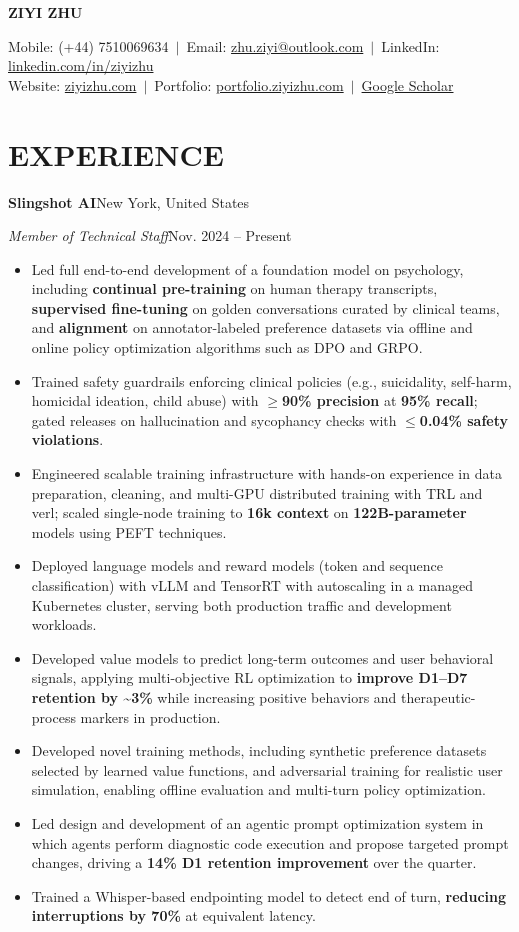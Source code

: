 \documentclass[10pt,a4paper]{article}
\newcommand{\name}[1]{\begin{center}\textbf{\Large #1}\end{center}}
\newcommand{\contactinfo}[4]{
    \begin{center}
    Mobile: #1 $\,\vert\,$ Email: \href{mailto:#2}{#2} $\,\vert\,$ LinkedIn: \href{https://#3}{#3}\\\vspace{1pt}
    Website: \href{https://#4}{#4} $\,\vert\,$ Portfolio: \href{https://portfolio.ziyizhu.com/}{portfolio.ziyizhu.com} $\,\vert\,$ \href{https://scholar.google.com/citations?user=wR-Ssa4AAAAJ}{Google Scholar}
    \end{center}
}
\newcommand{\experience}[4]{%
    \textbf{#1}\hfill #2\par\vspace{-0.5\baselineskip}%
    \textit{#3}\hfill #4\par\vspace{-0.5\baselineskip}%
}
\begin{document}
\name{ZIYI ZHU}
\contactinfo{(+44) 7510069634}{zhu.ziyi@outlook.com}{linkedin.com/in/ziyizhu}{ziyizhu.com}

\section{EXPERIENCE}
\experience{Slingshot AI}{New York, United States}
{Member of Technical Staff}{Nov. 2024 -- Present}
\begin{itemize}
    \item Led full end-to-end development of a foundation model on psychology, including \textbf{continual pre-training} on human therapy transcripts, \textbf{supervised fine-tuning} on golden conversations curated by clinical teams, and \textbf{alignment} on annotator-labeled preference datasets via offline and online policy optimization algorithms such as DPO and GRPO.
    \item Trained safety guardrails enforcing clinical policies (e.g., suicidality, self-harm, homicidal ideation, child abuse) with \textbf{$\geq$90\% precision} at \textbf{95\% recall}; gated releases on hallucination and sycophancy checks with \textbf{$\leq$0.04\% safety violations}.
    \item Engineered scalable training infrastructure with hands-on experience in data preparation, cleaning, and multi-GPU distributed training with TRL and verl; scaled single-node training to \textbf{16k context} on \textbf{122B-parameter} models using PEFT techniques.
    \item Deployed language models and reward models (token and sequence classification) with vLLM and TensorRT with autoscaling in a managed Kubernetes cluster, serving both production traffic and development workloads.
    \item Developed value models to predict long-term outcomes and user behavioral signals, applying multi-objective RL optimization to \textbf{improve D1--D7 retention by \textasciitilde{}3\%} while increasing positive behaviors and therapeutic-process markers in production.
    \item Developed novel training methods, including synthetic preference datasets selected by learned value functions, and adversarial training for realistic user simulation, enabling offline evaluation and multi-turn policy optimization.
    \item Led design and development of an agentic prompt optimization system in which agents perform diagnostic code execution and propose targeted prompt changes, driving a \textbf{14\% D1 retention improvement} over the quarter.
    \item Trained a Whisper-based endpointing model to detect end of turn, \textbf{reducing interruptions by 70\%} at equivalent latency.
\end{itemize}
\end{document}
